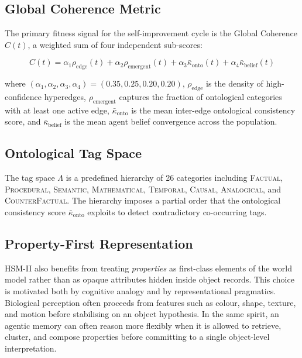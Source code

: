 \documentclass[11pt]{article}
\begin{document}
\subsection{Global Coherence Metric}

The primary fitness signal for the self-improvement cycle is the Global Coherence
$C(t)$, a weighted sum of four independent sub-scores:

\begin{equation}
  C(t) = \alpha_1 \rho_{\text{edge}}(t) + \alpha_2 \rho_{\text{emergent}}(t)
         + \alpha_3 \bar{\kappa}_{\text{onto}}(t) + \alpha_4 \bar{\kappa}_{\text{belief}}(t)
  \label{eq:coherence}
\end{equation}

where $(\alpha_1, \alpha_2, \alpha_3, \alpha_4) = (0.35, 0.25, 0.20, 0.20)$,
$\rho_{\text{edge}}$ is the density of high-confidence hyperedges,
$\rho_{\text{emergent}}$ captures the fraction of ontological categories with
at least one active edge, $\bar{\kappa}_{\text{onto}}$ is the mean inter-edge
ontological consistency score, and $\bar{\kappa}_{\text{belief}}$ is the mean
agent belief convergence across the population.

\subsection{Ontological Tag Space}

The tag space $\Lambda$ is a predefined hierarchy of 26 categories including
\textsc{Factual}, \textsc{Procedural}, \textsc{Semantic}, \textsc{Mathematical},
\textsc{Temporal}, \textsc{Causal}, \textsc{Analogical}, and
\textsc{CounterFactual}. The hierarchy imposes a partial order that the
ontological consistency score $\bar{\kappa}_{\text{onto}}$ exploits to detect
contradictory co-occurring tags.

\subsection{Property-First Representation}

HSM-II also benefits from treating \emph{properties} as first-class elements of
the world model rather than as opaque attributes hidden inside object records.
This choice is motivated both by cognitive analogy and by representational
pragmatics. Biological perception often proceeds from features such as colour,
shape, texture, and motion before stabilising on an object hypothesis. In the
same spirit, an agentic memory can often reason more flexibly when it is allowed
to retrieve, cluster, and compose properties before committing to a single
object-level interpretation.
\end{document}
